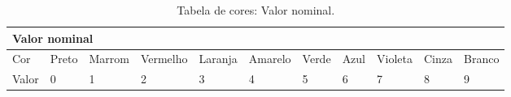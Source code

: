 \begin{table}[htpb]
\small
\caption{Tabela de cores: Valor nominal.}
\label{tab03}
\begin{tabularx}{\textwidth}{lllllllllll}
\toprule 
\multicolumn{11}{l}{Valor nominal} \\
\midrule
Cor & Preto & Marrom & Vermelho & Laranja & Amarelo & Verde & Azul & Violeta & Cinza & Branco \\
\midrule
Valor & 0 & 1 & 2 & 3 & 4 & 5 & 6 & 7 & 8 & 9 \\
\bottomrule
\end{tabularx}
\end{table}


